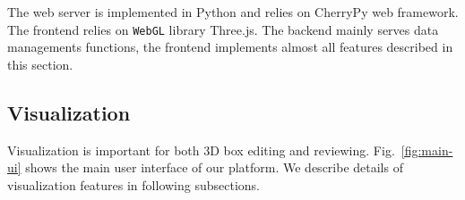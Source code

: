 \documentclass[letterpaper, 10 pt, conference]{ieeeconf}  %
\begin{document}
The web server is implemented in Python and relies on CherryPy\cite{cherrypy} web framework. The frontend relies on \texttt{WebGL} library Three.js\cite{threejs}. The backend mainly serves data managements functions, the frontend implements almost all features described in this section.

\subsection{Visualization}

Visualization is important for both 3D box editing and reviewing. Fig.~\ref{fig:main-ui} shows the main user interface of our platform. We describe details of visualization features in following subsections.
\end{document}
